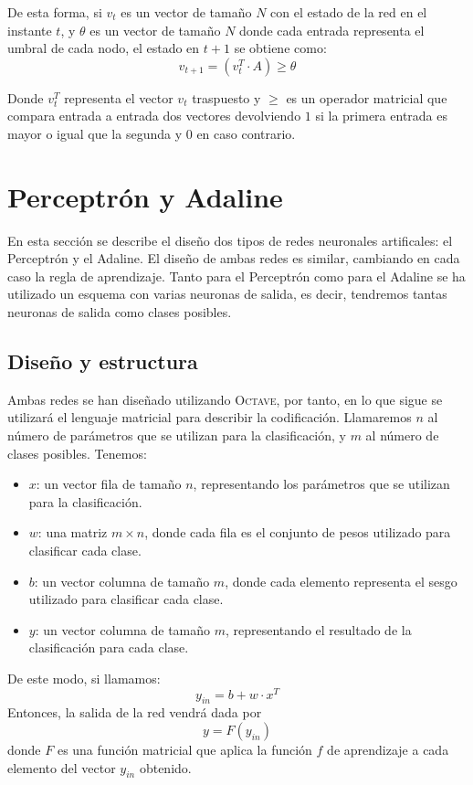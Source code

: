 \documentclass[spanish]{assignment}
\begin{document}
	De esta forma, si $v_t$ es un vector de tamaño $N$ con el estado de la red en el instante $t$, y $\theta$ es un vector de tamaño $N$ donde cada entrada representa el umbral de cada nodo, el estado en $t+1$ se obtiene como:
	$$v_{t+1} = \left(v_t^T\cdot A\right) \ge \theta$$
	
	Donde $v_t^T$ representa el vector $v_t$ traspuesto y $\ge$ es un operador matricial que compara entrada a entrada dos vectores devolviendo $1$ si la primera entrada es mayor o igual que la segunda y $0$ en caso contrario.
	
	\newpage
	\section{Perceptrón y Adaline}
	En esta sección se describe el diseño dos tipos de redes neuronales artificales: el Perceptrón y el Adaline. El diseño de ambas redes es similar, cambiando en cada caso la regla de aprendizaje. Tanto para el Perceptrón como para el Adaline se ha utilizado un esquema con varias neuronas de salida, es decir, tendremos tantas neuronas de salida como clases posibles.
	
	\subsection{Diseño y estructura}
	Ambas redes se han diseñado utilizando \textsc{Octave}, por tanto, en lo que sigue se utilizará el lenguaje matricial para describir la codificación.
	Llamaremos $n$ al número de parámetros que se utilizan para la clasificación, y $m$ al número de clases posibles. Tenemos: 
	\begin{itemize}
		\item $x$: un vector fila de tamaño $n$, representando los parámetros que se utilizan para la clasificación.
		\item $w$: una matriz $m\times n$, donde cada fila es el conjunto de pesos utilizado para clasificar cada clase.
		\item $b$: un vector columna de tamaño $m$, donde cada elemento representa el sesgo utilizado para clasificar cada clase.
		\item $y$: un vector columna de tamaño $m$, representando el resultado de la clasificación para cada clase.
	\end{itemize}
	De este modo, si llamamos:
	$$y_{in} = b + w\cdot x^T$$
	Entonces, la salida de la red vendrá dada por
	$$y = F\left(y_{in}\right)$$
	donde $F$ es una función matricial que aplica la función $f$ de aprendizaje a cada elemento del vector $y_{in}$ obtenido.
	
\end{document}
